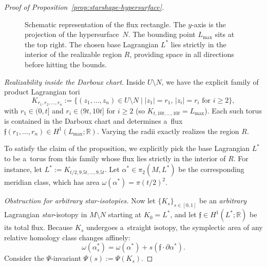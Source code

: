 \documentclass[pdftex]{sigma}
\numberwithin{equation}{section}
\newcommand{\bR}{{\mathbb R}}
\theoremstyle{definition}
\begin{document}
\begin{proof}[Proof of Proposition~\ref{prop:starshape-hypersurface}]
\begin{figure}[ht]
 \caption{Schematic representation of the flux rectangle. The $y$-axis is the projection of the hypersurface~$N$. The bounding point $L_{\max}$ sits at the top right. The chosen base Lagrangian $L^*$ lies strictly in the interior of the realizable region $R$, providing space in all directions before hitting the bounds.}
 \label{fig:flux-rectangle}
 \end{figure}


 \emph{Realizability inside the Darboux chart.}
 Inside $U\setminus N$, we have the explicit family of product Lagrangian tori
 \[
 K_{r_1,r_2,\dots,r_n}
 :=\{(z_1,\dots,z_n)\in U\setminus N \mid |z_1|=r_1,\, |z_i|=r_i \text{ for }i\ge 2\},
 \]
 with $r_1\in(0,t]$ and $r_i\in(9t,10t]$ for $i\ge 2$ (so $K_{t,10t,\dots,10t}=L_{\max}$).
 Each such torus is contained in the Darboux chart and determines a~flux $\mathfrak f(r_1,\dots,r_n)\in H^1(L_{\max};\bR)$.
 Varying the radii exactly realizes the region $R$.

 To satisfy the claim of the proposition, we explicitly pick the base Lagrangian $L^*$ to be a~torus from this family whose flux lies strictly in the interior of $R$. For instance, let $L^* := K_{t/2, 9.5t, \dots, 9.5t}$. Let $\alpha^* \in \pi_2(M, L^*)$ be the corresponding meridian class, which has area $\omega(\alpha^*) = \pi (t/2)^2$.

 \emph{Obstruction for arbitrary star-isotopies.}
 Now let $\{K_s\}_{s\in[0,1]}$ be an \emph{arbitrary} Lagrangian \emph{star}-isotopy in $M\setminus N$ starting at $K_0=L^*$, and let $\mathfrak f\in H^1(L^*;\bR)$ be its total flux.
 Because $K_s$ undergoes a~straight isotopy, the symplectic area of any relative homology class changes affinely:
 \[
 \omega(\alpha^*_s) = \omega(\alpha^*) +s(\mathfrak{f}\cdot\partial\alpha^*).
 \]
  Consider the $\Psi$-invariant $\Psi(s) := \Psi(K_s)$.


\end{proof}
\end{document}
